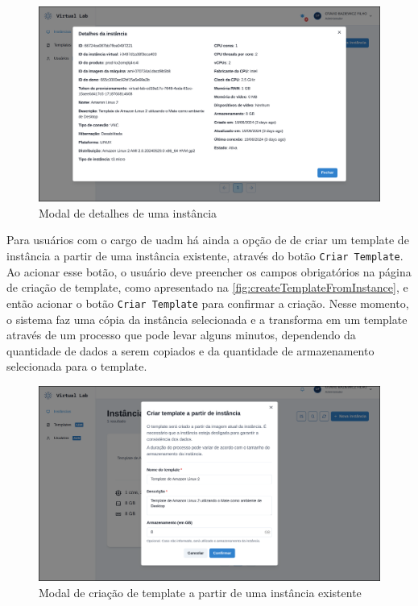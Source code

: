 \begin{figure}[H]
\caption{Modal de detalhes de uma instância}
\label{fig:instanceDetails}
\includegraphics[width=\textwidth]{capitulos/3-resultados/files/instance-details.png}
\end{figure}

Para usuários com o cargo de \gls{uadm} há ainda a opção de de criar um template de instância a partir de uma instância existente, através do botão \texttt{Criar Template}. Ao acionar esse botão, o usuário deve preencher os campos obrigatórios na página de criação de template, como apresentado na \autoref{fig:createTemplateFromInstance}, e então acionar o botão \texttt{Criar Template} para confirmar a criação. Nesse momento, o sistema faz uma cópia da instância selecionada e a transforma em um template através de um processo que pode levar alguns minutos, dependendo da quantidade de dados a serem copiados e da quantidade de armazenamento selecionada para o template.

\begin{figure}[H]
\caption{Modal de criação de template a partir de uma instância existente}
\label{fig:createTemplateFromInstance}
\includegraphics[width=\textwidth]{capitulos/3-resultados/files/create-template-from-instance.png}
\end{figure}

